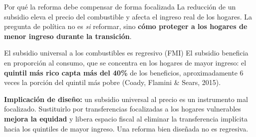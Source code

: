 \documentclass[aspectratio=169,10pt]{beamer}
\newcommand{\key}[1]{{\bfseries\color{AcentoRojo}#1}}
\begin{document}
\begin{frame}{Por qué la reforma debe compensar de forma focalizada}
  \small
  La reducción de un subsidio eleva el precio del combustible y afecta el ingreso real de los
  hogares. La pregunta de política no es \emph{si} reformar, sino \textbf{cómo proteger a los
  hogares de menor ingreso durante la transición}.

  \begin{block}{El subsidio universal a los combustibles es regresivo (FMI)}
    El subsidio beneficia en proporción al consumo, que se concentra en los hogares de mayor
    ingreso: el \key{quintil más rico capta más del 40\%} de los beneficios, aproximadamente
    6 veces la porción del quintil más pobre (Coady, Flamini \& Sears, 2015).
  \end{block}

  \textbf{Implicación de diseño:} un subsidio universal al precio es un instrumento mal
  focalizado. Sustituirlo por \alert{transferencias focalizadas} a los hogares vulnerables
  \textbf{mejora la equidad} y libera espacio fiscal al eliminar la transferencia implícita
  hacia los quintiles de mayor ingreso. Una reforma bien diseñada no es regresiva.

\end{frame}
\end{document}
